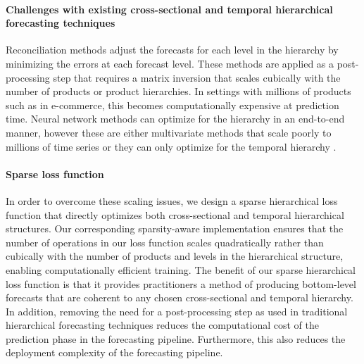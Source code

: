 \documentclass[preprint, 3p, times, twocolumn]{elsarticle}
\begin{document}

\paragraph{Challenges with existing cross-sectional and temporal hierarchical forecasting techniques} Reconciliation methods \cite{hyndman_optimal_2011,athanasopoulos_forecasting_2017,wickramasuriya_optimal_2019} adjust the forecasts for each level in the hierarchy by minimizing the errors at each forecast level. These methods are applied as a post-processing step that requires a matrix inversion that scales cubically with the number of products or product hierarchies. In settings with millions of products such as in e-commerce, this becomes computationally expensive at prediction time. Neural network methods can optimize for the hierarchy in an end-to-end manner, however these are either multivariate methods that scale poorly to millions of time series \cite{rangapuram_endtoend_2021} or they can only optimize for the temporal hierarchy \cite{rangapuram_coherent_2023}.
  
\paragraph{Sparse loss function} In order to overcome these scaling issues, we design a sparse hierarchical loss function that directly optimizes both cross-sectional and temporal hierarchical structures. Our corresponding sparsity-aware implementation ensures that the number of operations in our loss function scales quadratically rather than cubically with the number of products and levels in the hierarchical structure, enabling computationally efficient training. The benefit of our sparse hierarchical loss function is that it provides practitioners a method of producing bottom-level forecasts that are coherent to any chosen cross-sectional and temporal hierarchy. In addition, removing the need for a post-processing step as used in traditional hierarchical forecasting techniques reduces the computational cost of the prediction phase in the forecasting pipeline. Furthermore, this also reduces the deployment complexity of the forecasting pipeline.
\end{document}
